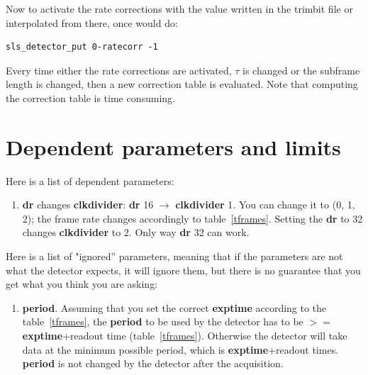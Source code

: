 \documentclass{article}
\begin{document}
 Now to activate the rate corrections with the value written in the trimbit file or interpolated from there, once would do: 
\begin{verbatim}
sls_detector_put 0-ratecorr -1
\end{verbatim}

Every time either the rate corrections are activated, $\tau$ is changed or the subframe length is changed, then a new correction table is evaluated. Note that computing the correction table is time consuming. 

\section{Dependent parameters and limits}
Here is a list of dependent parameters:
\begin{enumerate}
\item \textbf{dr} changes \textbf{clkdivider}: \textbf{dr} 16 $\to$  \textbf{clkdivider} 1. You can change it to (0, 1, 2); the frame rate changes accordingly to table~\ref{tframes}. Setting the \textbf{dr} to 32 changes \textbf{clkdivider} to 2. Only way  \textbf{dr} 32 can work. 
\end{enumerate}

Here is a list of "ignored'' parameters, meaning that if the parameters are not what the detector expects, it will ignore them, but there is no guarantee that you get what you think you are asking: 
\begin{enumerate}
\item \textbf{period}. Assuming that you set the correct \textbf{exptime} according to the table~\ref{tframes}, the \textbf{period} to be used by the detector has to be $>=$ \textbf{exptime}+readout time (table~\ref{tframes}). Otherwise the detector will take data at the minimum possible period, which is \textbf{exptime}+readout times. \textbf{period} is not changed by the detector after the acquisition. 
\end{enumerate}
\end{document}
